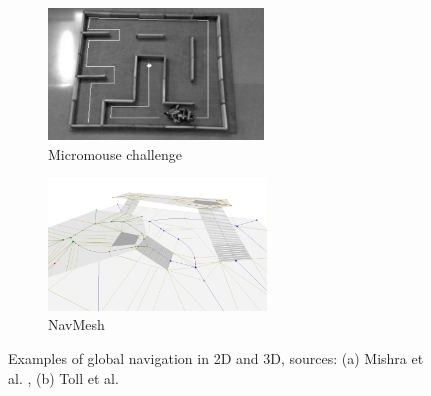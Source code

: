 \begin{figure}[h]
    \centering
    \captionsetup[subfigure]{justification=centering}
    \begin{subfigure}[t]{0.4\linewidth}
    \includegraphics[width=\textwidth,height=3.5cm]{Figures/Chapter_SOTA//micromouse_maze.png}
    \caption{Micromouse challenge}
    \label{fig:global_nav_0}
    \end{subfigure}
    \begin{subfigure}[t]{0.4\linewidth}
    \includegraphics[width=\textwidth,height=3.5cm]{Figures/Chapter_SOTA//navMesh.png}
    \caption{NavMesh}
    \label{fig:global_nav_1}
    \end{subfigure}
    \caption{Examples of global navigation in 2D and 3D, sources: (a) Mishra et al. \cite{micromouse_mishra_2008}, (b) Toll et al. \cite{toll_2011_navMesh}} %
    \label{fig:global_nav}
\end{figure}

